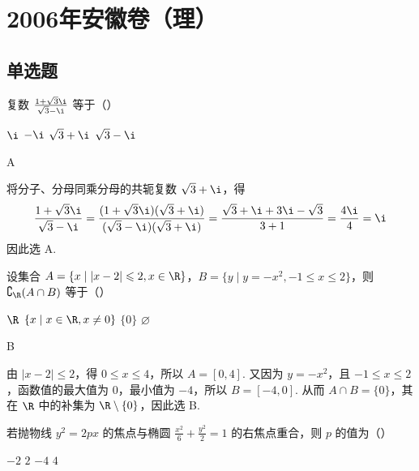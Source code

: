 \chapter{2006年安徽卷（理）}
\section{单选题}
\begin{problem}
复数 \(\frac{1+\sqrt{3}\i}{\sqrt{3}-\i}\) 等于（\quad）

\choices
    {\(\i\)}
    {\(-\i\)}
    {\(\sqrt{3}+\i\)}
    {\(\sqrt{3}-\i\)}
\end{problem}

\begin{answer}
A
\end{answer}

\begin{solution}
将分子、分母同乘分母的共轭复数 \(\sqrt{3}+\i\)，得
\[
\frac{1+\sqrt{3}\i}{\sqrt{3}-\i}
=\frac{(1+\sqrt{3}\i)(\sqrt{3}+\i)}{(\sqrt{3}-\i)(\sqrt{3}+\i)}
=\frac{\sqrt{3}+\i+3\i-\sqrt{3}}{3+1}
=\frac{4\i}{4}=\i
\]
因此选 A.
\end{solution}

\begin{problem}
设集合 \(A = \{x \mid |x - 2| \leqslant 2, x \in \R\}\)，\(B = \{y \mid y = -x^2, -1 \leqslant x \leqslant 2\}\)，则 \(\complement_{\R}(A \cap B)\) 等于（\quad）

\choices
    {\(\R\)}
    {\(\{x\mid x\in \R,x\neq 0\}\)}
    {\(\{0\}\)}
    {\(\varnothing\)}
\end{problem}

\begin{answer}
B
\end{answer}

\begin{solution}
由 \(|x-2|\leqslant2\)，得 \(0\leqslant x\leqslant4\)，所以 \(A=[0,4]\).
又因为 \(y=-x^2\)，且 \(-1\leqslant x\leqslant2\)，函数值的最大值为 \(0\)，最小值为 \(-4\)，所以 \(B=[-4,0]\).
从而 \(A\cap B=\{0\}\)，其在 \(\R\) 中的补集为 \(\R\mathbin{\backslash}\{0\}\)，因此选 B.
\end{solution}

\begin{problem}
若抛物线 \(y^{2} = 2px\) 的焦点与椭圆 \(\frac{x^2}{6} + \frac{y^2}{2} = 1\) 的右焦点重合，则 \(p\) 的值为（\quad）

\choices
    {\(-2\)}
    {\(2\)}
    {\(-4\)}
    {\(4\)}
\end{problem}

